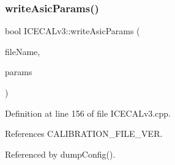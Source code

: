 \subsubsection{\texorpdfstring{write\+Asic\+Params()}{writeAsicParams()}}
{\footnotesize\ttfamily bool I\+C\+E\+C\+A\+Lv3\+::write\+Asic\+Params (\begin{DoxyParamCaption}\item[{string}]{file\+Name,  }\item[{Py\+Object $\ast$}]{params }\end{DoxyParamCaption})\hspace{0.3cm}{\ttfamily [private]}}



Definition at line 156 of file I\+C\+E\+C\+A\+Lv3.\+cpp.



References C\+A\+L\+I\+B\+R\+A\+T\+I\+O\+N\+\_\+\+F\+I\+L\+E\+\_\+\+V\+ER.



Referenced by dump\+Config().


